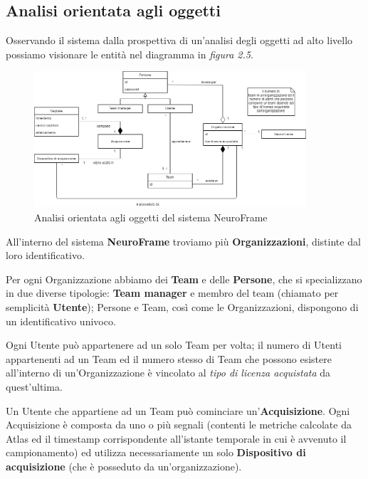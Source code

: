 \subsection{Analisi orientata agli oggetti}
Osservando il sistema dalla prospettiva di un'analisi degli oggetti ad alto livello possiamo visionare le entità nel diagramma in \emph{figura 2.5}.
\vspace{5mm}
\begin{figure}[H]
  \centering
  \includegraphics[width=0.9\textwidth]{img/Analisi orientata agli oggetti - NeuroFrame.png}
  \caption{Analisi orientata agli oggetti del sistema NeuroFrame}
\end{figure}
\vspace{5mm}
\noindent All'interno del sistema {\bf NeuroFrame} troviamo più {\bf Organizzazioni}, distinte dal loro identificativo.\newline

\noindent Per ogni Organizzazione abbiamo dei {\bf Team} e delle {\bf Persone}, che si specializzano in due diverse tipologie: {\bf Team manager} e membro del team ({chiamato per semplicità {\bf Utente}}); Persone e Team, così come le Organizzazioni, dispongono di un identificativo univoco.\newline

\noindent Ogni Utente può appartenere ad un solo Team per volta; il numero di Utenti appartenenti ad un Team ed il numero stesso di Team che possono esistere all'interno di un'Organizzazione è vincolato al \emph{tipo di licenza acquistata} da quest'ultima.\newline

\noindent Un Utente che appartiene ad un Team può cominciare un'{\bf Acquisizione}.\newline
Ogni Acquisizione è composta da uno o più segnali (contenti le metriche calcolate da Atlas ed il timestamp corrispondente all'istante temporale in cui è avvenuto il campionamento) ed utilizza necessariamente un solo {\bf Dispositivo di acquisizione} (che è posseduto da un'organizzazione).
